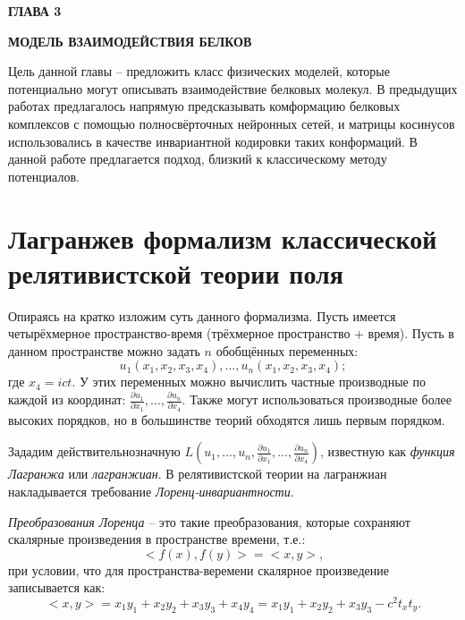 \newpage
\begin{center}
	\textbf{\large ГЛАВА 3}

	\textbf{\large МОДЕЛЬ ВЗАИМОДЕЙСТВИЯ БЕЛКОВ}
\end{center}

Цель данной главы -- предложить класс физических моделей, которые потенциально могут описывать взаимодействие белковых молекул.
В предыдущих работах \cite{prip2023} предлагалось напрямую предсказывать комформацию белковых комплексов с помощью полносвёрточных нейронных сетей,
и матрицы косинусов использовались в качестве инвариантной кодировки таких конформаций. В данной работе предлагается подход, близкий к классическому методу потенциалов.

\section{Лагранжев формализм классической релятивистской теории поля}
Опираясь на \cite{field_theory} кратко изложим суть данного формализма. Пусть имеется четырёхмерное пространство-время (трёхмерное пространство + время).
Пусть в данном пространстве можно задать $n$ обобщённых переменных:
\begin{equation}
	u_1(x_1, x_2, x_3, x_4), ..., u_n(x_1, x_2, x_3, x_4);
	\label{generalized_variables}
\end{equation}
где $x_4 = ict$. У этих переменных можно вычислить
частные производные по каждой из координат: $\frac{\partial{u_1}}{\partial{x_1}}, ..., \frac{\partial{u_n}}{\partial{x_4}}$. Также могут использоваться производные
более высоких порядков, но в большинстве теорий обходятся лишь первым порядком.

Зададим действительнозначную $L(u_1, ..., u_n, \frac{\partial{u_1}}{\partial{x_1}}, ..., \frac{\partial{u_n}}{\partial{x_4}})$, известную как \textit{функция Лагранжа} или \textit{лагранжиан}.
В релятивистской теории на лагранжиан накладывается требование \textit{Лоренц-инвариантности}.

\textit{Преобразования Лоренца} -- это такие преобразования, которые сохраняют скалярные произведения в пространстве времени, т.е.:
\begin{equation}
	<f(x), f(y)> = <x, y>,
	\label{Lorenz_group}
\end{equation}
при условии, что для пространства-веремени скалярное произведение записывается как:
\begin{equation}
	<x, y> = x_1y_1 + x_2y_2 + x_3y_3 + x_4y_4 = x_1y_1 + x_2y_2 + x_3y_3 - c^2t_xt_y.
	\label{Minkowski_product}
\end{equation}


